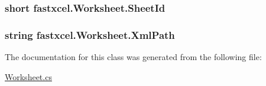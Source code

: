 \label{classfastxcel_1_1_worksheet_a232d0b0bda13403f81bdcad654cf077e}
\hypertarget{classfastxcel_1_1_worksheet_a0df0dd75430f0fc3528eb37d679b9a95}{
\subsubsection[{SheetId}]{\setlength{\rightskip}{0pt plus 5cm}short fastxcel.Worksheet.SheetId}}
\label{classfastxcel_1_1_worksheet_a0df0dd75430f0fc3528eb37d679b9a95}
\hypertarget{classfastxcel_1_1_worksheet_ab96ae7cff692cb6d855ff832b0cebb0f}{
\subsubsection[{XmlPath}]{\setlength{\rightskip}{0pt plus 5cm}string fastxcel.Worksheet.XmlPath}}
\label{classfastxcel_1_1_worksheet_ab96ae7cff692cb6d855ff832b0cebb0f}


The documentation for this class was generated from the following file:\begin{DoxyCompactItemize}
\item 
\hyperlink{_worksheet_8cs}{Worksheet.cs}\end{DoxyCompactItemize}
